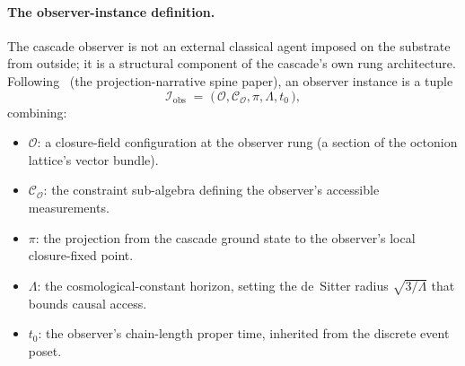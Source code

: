 \documentclass[11pt]{article}
\theoremstyle{plain}
\theoremstyle{definition}
\theoremstyle{remark}
\newcommand{\Ical}{\mathcal{I}}
\begin{document}
\paragraph{The observer-instance definition.} The cascade observer is not an external classical agent imposed on the substrate from outside; it is a structural component of the cascade's own rung architecture. Following~\citet{realisation} (the projection-narrative spine paper), an observer instance is a tuple
\[
  \Ical_\mathrm{obs} \;=\; \big(\,\mathcal{O}, \mathcal{C}_\mathcal{O}, \pi, \Lambda, t_0\,\big),
\]
combining:
\begin{itemize}[leftmargin=2em]
\item $\mathcal{O}$: a closure-field configuration at the observer rung (a section of the octonion lattice's vector bundle).
\item $\mathcal{C}_\mathcal{O}$: the constraint sub-algebra defining the observer's accessible measurements.
\item $\pi$: the projection from the cascade ground state to the observer's local closure-fixed point.
\item $\Lambda$: the cosmological-constant horizon, setting the de~Sitter radius $\sqrt{3/\Lambda}$ that bounds causal access.
\item $t_0$: the observer's chain-length proper time, inherited from the discrete event poset.
\end{itemize}
\end{document}
